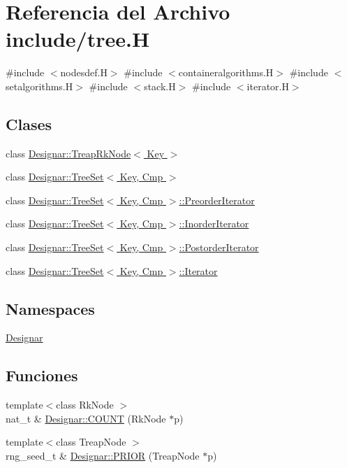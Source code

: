 \hypertarget{tree_8_h}{}\section{Referencia del Archivo include/tree.H}
\label{tree_8_h}
{\ttfamily \#include $<$nodesdef.\+H$>$}\newline
{\ttfamily \#include $<$containeralgorithms.\+H$>$}\newline
{\ttfamily \#include $<$setalgorithms.\+H$>$}\newline
{\ttfamily \#include $<$stack.\+H$>$}\newline
{\ttfamily \#include $<$iterator.\+H$>$}\newline
\subsection*{Clases}
\begin{DoxyCompactItemize}
\item 
class \hyperlink{class_designar_1_1_treap_rk_node}{Designar\+::\+Treap\+Rk\+Node$<$ Key $>$}
\item 
class \hyperlink{class_designar_1_1_tree_set}{Designar\+::\+Tree\+Set$<$ Key, Cmp $>$}
\item 
class \hyperlink{class_designar_1_1_tree_set_1_1_preorder_iterator}{Designar\+::\+Tree\+Set$<$ Key, Cmp $>$\+::\+Preorder\+Iterator}
\item 
class \hyperlink{class_designar_1_1_tree_set_1_1_inorder_iterator}{Designar\+::\+Tree\+Set$<$ Key, Cmp $>$\+::\+Inorder\+Iterator}
\item 
class \hyperlink{class_designar_1_1_tree_set_1_1_postorder_iterator}{Designar\+::\+Tree\+Set$<$ Key, Cmp $>$\+::\+Postorder\+Iterator}
\item 
class \hyperlink{class_designar_1_1_tree_set_1_1_iterator}{Designar\+::\+Tree\+Set$<$ Key, Cmp $>$\+::\+Iterator}
\end{DoxyCompactItemize}
\subsection*{Namespaces}
\begin{DoxyCompactItemize}
\item 
 \hyperlink{namespace_designar}{Designar}
\end{DoxyCompactItemize}
\subsection*{Funciones}
\begin{DoxyCompactItemize}
\item 
{\footnotesize template$<$class Rk\+Node $>$ }\\nat\+\_\+t \& \hyperlink{namespace_designar_a473e1d283b3fd0a75ec0c645eeb7818d}{Designar\+::\+C\+O\+U\+NT} (Rk\+Node $\ast$p)
\item 
{\footnotesize template$<$class Treap\+Node $>$ }\\rng\+\_\+seed\+\_\+t \& \hyperlink{namespace_designar_a0189c4d8fbe8db0c8189d80989a4e9ca}{Designar\+::\+P\+R\+I\+OR} (Treap\+Node $\ast$p)
\end{DoxyCompactItemize}

